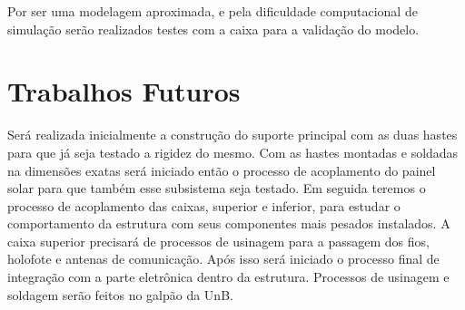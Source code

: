 Por ser uma modelagem aproximada, e pela dificuldade computacional de simulação serão realizados testes com a caixa para a validação do modelo. 

\section{Trabalhos Futuros}

Será realizada inicialmente a construção do suporte principal com as duas hastes para que já seja testado a rigidez do mesmo. Com as hastes montadas e soldadas na dimensões exatas será iniciado então o processo de acoplamento do painel solar para que também esse subsistema seja testado. Em seguida teremos o processo de acoplamento das caixas, superior e inferior, para estudar o comportamento da estrutura com seus componentes mais pesados instalados. A caixa superior precisará de processos de usinagem para a passagem dos fios, holofote e antenas de comunicação. Após isso será iniciado o processo final de integração com a parte eletrônica dentro da estrutura. Processos de usinagem e soldagem serão feitos no galpão da UnB.


